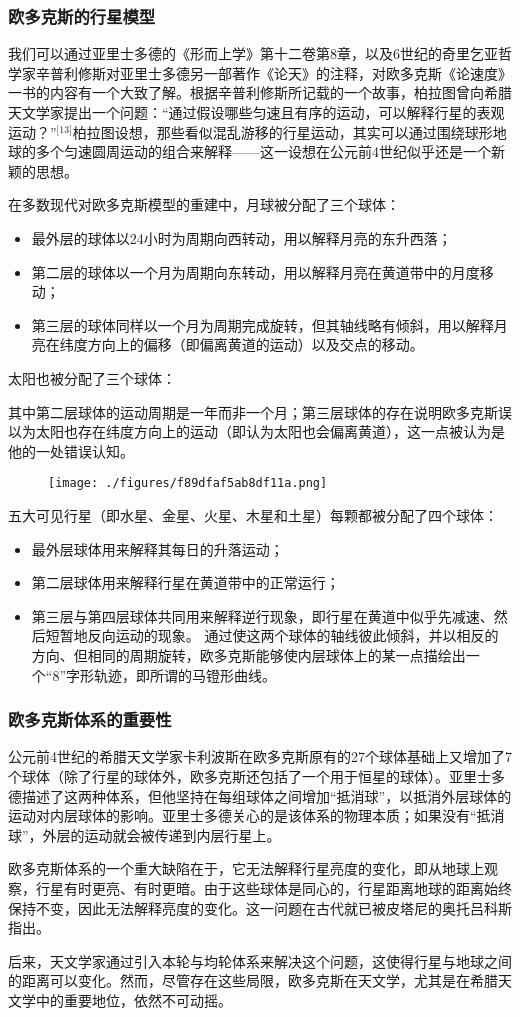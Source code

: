 \subsubsection{欧多克斯的行星模型}
我们可以通过亚里士多德的《形而上学》第十二卷第8章，以及6世纪的奇里乞亚哲学家辛普利修斯对亚里士多德另一部著作《论天》的注释，对欧多克斯《论速度》一书的内容有一个大致了解。根据辛普利修斯所记载的一个故事，柏拉图曾向希腊天文学家提出一个问题：“通过假设哪些匀速且有序的运动，可以解释行星的表观运动？”\(^\text{[13]}\)柏拉图设想，那些看似混乱游移的行星运动，其实可以通过围绕球形地球的多个匀速圆周运动的组合来解释——这一设想在公元前4世纪似乎还是一个新颖的思想。

在多数现代对欧多克斯模型的重建中，月球被分配了三个球体：
\begin{itemize}
\item 最外层的球体以24小时为周期向西转动，用以解释月亮的东升西落；
\item 第二层的球体以一个月为周期向东转动，用以解释月亮在黄道带中的月度移动；
\item 第三层的球体同样以一个月为周期完成旋转，但其轴线略有倾斜，用以解释月亮在纬度方向上的偏移（即偏离黄道的运动）以及交点的移动。
\end{itemize}
太阳也被分配了三个球体：

其中第二层球体的运动周期是一年而非一个月；第三层球体的存在说明欧多克斯误以为太阳也存在纬度方向上的运动（即认为太阳也会偏离黄道），这一点被认为是他的一处错误认知。
\begin{figure}[ht]
\centering
\texttt{[image: ./figures/f89dfaf5ab8df11a.png]}
\caption{} \label{fig_ODK_1}
\end{figure}
五大可见行星（即水星、金星、火星、木星和土星）每颗都被分配了四个球体：
\begin{itemize}
\item 最外层球体用来解释其每日的升落运动；
\item 第二层球体用来解释行星在黄道带中的正常运行；
\item 第三层与第四层球体共同用来解释逆行现象，即行星在黄道中似乎先减速、然后短暂地反向运动的现象。
通过使这两个球体的轴线彼此倾斜，并以相反的方向、但相同的周期旋转，欧多克斯能够使内层球体上的某一点描绘出一个“8”字形轨迹，即所谓的马镫形曲线。
\end{itemize}
\subsubsection{欧多克斯体系的重要性}
公元前4世纪的希腊天文学家卡利波斯在欧多克斯原有的27个球体基础上又增加了7个球体（除了行星的球体外，欧多克斯还包括了一个用于恒星的球体）。亚里士多德描述了这两种体系，但他坚持在每组球体之间增加“抵消球”，以抵消外层球体的运动对内层球体的影响。亚里士多德关心的是该体系的物理本质；如果没有“抵消球”，外层的运动就会被传递到内层行星上。

欧多克斯体系的一个重大缺陷在于，它无法解释行星亮度的变化，即从地球上观察，行星有时更亮、有时更暗。由于这些球体是同心的，行星距离地球的距离始终保持不变，因此无法解释亮度的变化。这一问题在古代就已被皮塔尼的奥托吕科斯指出。

后来，天文学家通过引入本轮与均轮体系来解决这个问题，这使得行星与地球之间的距离可以变化。然而，尽管存在这些局限，欧多克斯在天文学，尤其是在希腊天文学中的重要地位，依然不可动摇。

